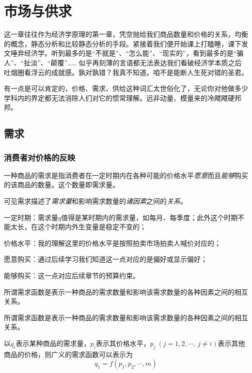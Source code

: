 \chapter{市场与供求}
\label{sec:market-supply-and-demand}

这一章往往作为经济学原理的第一章，凭空抛给我们商品数量和价格的关系，均衡的概念，静态分析和比较静态分析的手段。紧接着我们便开始课上打瞌睡，课下发文唾弃经济学。听到最多的是“不就是”、“怎么能”、“现实的”，看到最多的是“骗人”、“扯淡”、“颠覆”…… 似乎再刻薄的言语都无法表达我们看破经济学本质之后吐烟圈看浮云的成就感。孰对孰错？我真不知道。咱不是能断人生死对错的圣君。

有一点是可以肯定的，价格、需求、供给这种词汇太世俗化了，无论你对他做多少学科内的界定都无法消除人们对它的惯常理解。远非动量、模量来的冷飕飕硬邦邦。

\section{需求}
\subsection{消费者对价格的反映}
一种商品的需求是指消费者在一定时期内在各种可能的价格水平\emph{愿意}而且\emph{能够}购买的该商品的数量。这个数量即需求量。

可见需求描述了\emph{需求量}和影响需求数量的\emph{诸因素}之间的\emph{关系}。
\begin{compactitem}
\item 一定时期：需求量$q$值得是某时期内的需求量，如每月、每季度；此外这个时期不能太长，在这个时期内外生变量是稳定不变的；
\item 价格水平：我的理解这里的价格水平是按照拍卖市场拍卖人喊价对应的；
\item 愿意购买：通过后续学习我们知道这一点对应的是偏好或显示偏好；
\item 能够购买：这一点对应后续章节的预算约束。
\end{compactitem}

所谓需求函数是表示一种商品的需求数量和影响该需求数量的各种因素之间的相互关系。

所谓需求函数是表示一种商品的需求数量和影响该需求数量的各种因素之间的相互关系。

以$q_i$表示某种商品的需求量，$p_i$表示其价格水平，$p_j~(j=1,2,\cdots,~j \ne i)$表示其他商品的价格，则广义的需求函数可以表示为
\begin{equation}
q_1=f(p_1,p_2,\cdots,m)
\label{eq:demand-function}
\end{equation}

